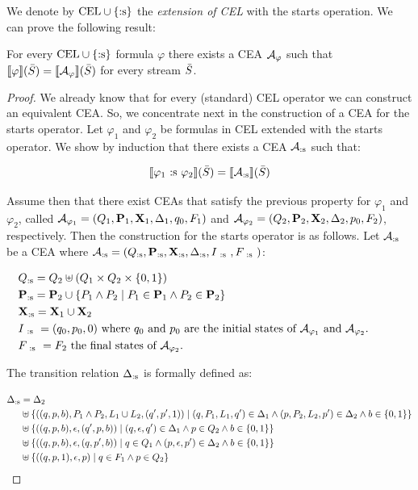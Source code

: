 We denote by $\text{CEL} \cup \{\text{:s}\}$ the \emph{extension of CEL} with the starts operation. We can prove the following result:

\begin{theorem} \label{theo:starts}
	For every $\text{CEL} \cup \{\text{:s}\}$ formula $\varphi$ there exists a CEA $\mathcal{A}_\varphi$ such that $\sem{\varphi}(\Stream) = \sem{\cA_\varphi}(\Stream)$ for every stream $\bar{S}$.
\end{theorem}

\begin{proof}
	We already know that for every (standard) CEL operator we can construct an equivalent CEA. So, we concentrate next in the construction of a CEA for the starts operator.
	Let $\varphi_1$ and $\varphi_2$ be formulas in CEL extended with the starts operator. We show by induction that there exists a CEA $\mathcal{A}_{\text{:s}}$ such that:
	
	
	$$\sem{\varphi_1 \starts \varphi_2}(\Stream) = \sem{\cAstarts}(\Stream)$$
	
	
	Assume then that there exist CEAs that satisfy the previous property for $\varphi_1$ and $\varphi_2$, called $\mathcal{A}_{\varphi_1} = (Q_1, \mathbf{P}_1, \mathbf{X}_1, \Delta_1, q_0, F_1)$ and $\mathcal{A}_{\varphi_2} = (Q_2, \mathbf{P}_2, \mathbf{X}_2, \Delta_2, p_0, F_2)$, respectively.
	Then the construction for the starts operator is as follows.
	Let $\mathcal{A}_{\text{:s}}$ be a CEA where $\mathcal{A}_{\text{:s}} = (Q_{\text{:s}}, \mathbf{P}_{\text{:s}}, \mathbf{X}_{\text{:s}}, \Delta_{\text{:s}}, I_{~\text{:s}~}, F_{~\text{:s}~})$:
	
	
	$$\begin{aligned}[t] 		
		& \Qstarts = Q_2 \uplus (Q_1 \times Q_2 \times \{0, 1\}) \\ 		
		& \Pstarts = \SETP_2 \cup \{ P_1 \land P_2 \mid P_1 \in \SETP_1 \land P_2 \in \SETP_2 \} \hspace*{155px}\\ 		
		& \Xstarts  = \SETX_1 \cup \SETX_2 \\ 		
		& I_{\starts} = (q_0, p_0, 0) \text{ where } q_0 \text{ and } p_0 \text{ are the initial states of } \cA_{\varphi_1} \text{ and } \cA_{\varphi_2}.\\ 		
		& F_{\starts} = F_2 \text{ the final states of } \cA_{\varphi_2}. 	\end{aligned}$$
	
	
	The transition relation $\Delta_{\text{:s}}$ is formally defined as:
	
	$$\begin{aligned}[t] 		
		\Delta_{\text{:s}} 
		& = \Delta_2\\ 		
		& \uplus \{((q, p, b), P_1 \land P_2, L_1 \cup L_2, (q', p', 1)) \mid (q, P_1, L_1, q') \in \Delta_1 \land (p, P_2, L_2, p') \in \Delta_2 \land b \in \{0, 1\}\} \\ 		
		& \uplus \{((q, p, b), \epsilon, (q', p, b)) \mid (q, \epsilon, q') \in \Delta_1 \land p \in Q_2 \land b \in \{0, 1\}\}  \\ 		
		& \uplus \{((q, p, b), \epsilon, (q, p', b)) \mid q \in Q_1 \land (p, \epsilon, p') \in \Delta_2 \land b \in \{0, 1\}\}  \\ 		
		& \uplus \{((q, p, 1), \epsilon, p) \mid q \in F_1 \land p \in Q_2\} 	\end{aligned}$$
	

\end{proof}
